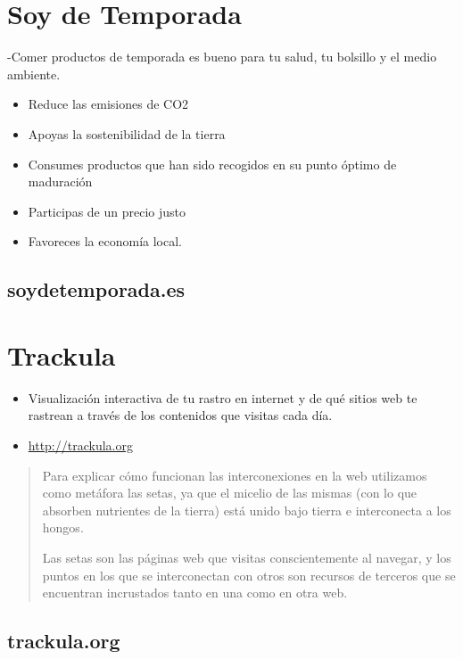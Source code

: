 \documentclass[11pt]{article}
\begin{document}
\section*{Soy de Temporada}
\label{sec:orgc6288f0}
-Comer productos de temporada es bueno para tu salud, tu bolsillo y el medio ambiente.
\begin{itemize}
\item Reduce las emisiones de CO2
\item Apoyas la sostenibilidad de la tierra
\item Consumes productos que han sido recogidos en su punto óptimo de maduración
\item Participas de un precio justo
\item Favoreces la economía local.
\end{itemize}
\subsection*{soydetemporada.es}
\label{sec:orgadbff12}


\section*{Trackula}
\label{sec:org18ea1da}
\begin{itemize}
\item Visualización interactiva de tu rastro en internet y de qué sitios web te rastrean a través de los contenidos que visitas cada día.
\item \url{http://trackula.org}
\end{itemize}

\begin{quote}
Para explicar cómo funcionan las interconexiones en la web utilizamos como metáfora las setas, ya que el micelio de las mismas (con lo que absorben nutrientes de la tierra) está unido bajo tierra e interconecta a los hongos.

Las setas son las páginas web que visitas conscientemente al navegar, y los puntos en los que se interconectan con otros son recursos de terceros que se encuentran incrustados tanto en una como en otra web.
\end{quote}
\subsection*{trackula.org}
\label{sec:org7049415}
\end{document}
